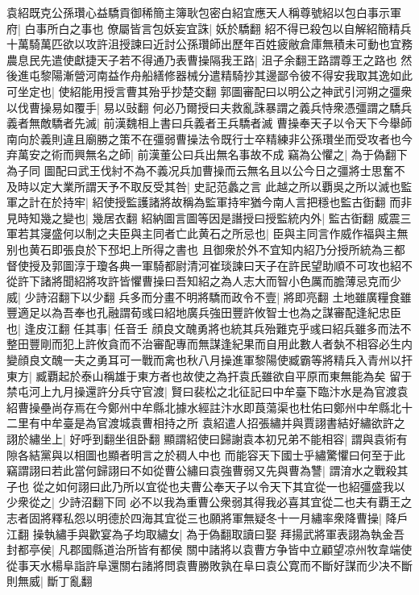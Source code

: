 袁紹既克公孫瓚心益驕貢御稀簡主簿耿包密白紹宜應天人稱尊號紹以包白事示軍府|{
	白事所白之事也}
僚屬皆言包妖妄宜誅|{
	妖於驕翻}
紹不得已殺包以自解紹簡精兵十萬騎萬匹欲以攻許沮授諫曰近討公孫瓚師出歷年百姓疲敝倉庫無積未可動也宜務農息民先遣使獻捷天子若不得通乃表曹操隔我王路|{
	沮子余翻王路謂尊王之路也}
然後進屯黎陽漸營河南益作舟船繕修器械分遣精騎抄其邊鄙令彼不得安我取其逸如此可坐定也|{
	使紹能用授言曹其殆乎抄楚交翻}
郭圖審配曰以明公之神武引河朔之彊衆以伐曹操易如覆手|{
	易以䜴翻}
何必乃爾授曰夫救亂誅暴謂之義兵恃衆憑彊謂之驕兵義者無敵驕者先滅|{
	前漢魏相上書曰兵義者王兵驕者滅}
曹操奉天子以令天下今舉師南向於義則違且廟勝之策不在彊弱曹操法令既行士卒精練非公孫瓚坐而受攻者也今弃萬安之術而興無名之師|{
	前漢董公曰兵出無名事故不成}
竊為公懼之|{
	為于偽翻下為子同}
圖配曰武王伐紂不為不義况兵加曹操而云無名且以公今日之彊將士思奮不及時以定大業所謂天予不取反受其咎|{
	史記范蠡之言}
此越之所以覇吳之所以滅也監軍之計在於持牢|{
	紹使授監護諸將故稱為監軍持牢猶今南人言把穩也監古衘翻}
而非見時知幾之變也|{
	幾居衣翻}
紹納圖言圖等因是譖授曰授監統内外|{
	監古衘翻}
威震三軍若其寖盛何以制之夫臣與主同者亡此黄石之所忌也|{
	臣與主同言作威作福與主無别也黄石即張良於下邳圯上所得之書也}
且御衆於外不宜知内紹乃分授所統為三都督使授及郭圖淳于瓊各典一軍騎都尉清河崔琰諫曰天子在許民望助順不可攻也紹不從許下諸將聞紹將攻許皆懼曹操曰吾知紹之為人志大而智小色厲而膽薄忌克而少威|{
	少詩沼翻下以少翻}
兵多而分畫不明將驕而政令不壹|{
	將即亮翻}
土地雖廣糧食雖豐適足以為吾奉也孔融謂荀彧曰紹地廣兵強田豐許攸智士也為之謀審配逢紀忠臣也|{
	逢皮江翻}
任其事|{
	任音壬}
顔良文醜勇將也統其兵殆難克乎彧曰紹兵雖多而法不整田豐剛而犯上許攸貪而不治審配專而無謀逢紀果而自用此數人者埶不相容必生内變顔良文醜一夫之勇耳可一戰而禽也秋八月操進軍黎陽使臧霸等將精兵入青州以扞東方|{
	臧覇起於泰山稱雄于東方者也故使之為扞袁氏雖欲自平原而東無能為矣}
留于禁屯河上九月操還許分兵守官渡|{
	賢曰裴松之北征記曰中牟臺下臨汴水是為官渡袁紹曹操壘尚存焉在今鄭州中牟縣北據水經註汴水即莨蕩渠也杜佑曰鄭州中牟縣北十二里有中牟臺是為官渡城袁曹相持之所}
袁紹遣人招張繡并與賈詡書結好繡欲許之詡於繡坐上|{
	好呼到翻坐徂卧翻}
顯謂紹使曰歸謝袁本初兄弟不能相容|{
	謂與袁術有隙各結黨與以相圖也顯者明言之於稠人中也}
而能容天下國士乎繡驚懼曰何至于此竊謂詡曰若此當何歸詡曰不如從曹公繡曰袁強曹弱又先與曹為讐|{
	謂淯水之戰殺其子也}
從之如何詡曰此乃所以宜從也夫曹公奉天子以令天下其宜從一也紹彊盛我以少衆從之|{
	少詩沼翻下同}
必不以我為重曹公衆弱其得我必喜其宜從二也夫有覇王之志者固將釋私怨以明德於四海其宜從三也願將軍無疑冬十一月繡率衆降曹操|{
	降戶江翻}
操執繡手與歡宴為子均取繡女|{
	為于偽翻取讀曰娶}
拜揚武將軍表詡為執金吾封都亭侯|{
	凡郡國縣道治所皆有都侯}
關中諸將以袁曹方争皆中立顧望凉州牧韋端使從事天水楊阜詣許阜還關右諸將問袁曹勝敗孰在阜曰袁公寛而不斷好謀而少决不斷則無威|{
	斷丁亂翻}
